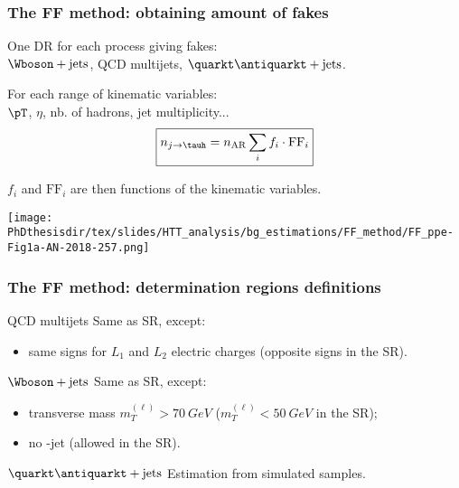\begin{frame}
\frametitle{The FF method: obtaining amount of fakes}

\begin{minipage}[c]{.45\textwidth}
\manip One DR for each process giving fakes:\\$\Wboson+\text{jets}$, QCD multijets, $\quarkt\antiquarkt+\text{jets}$.

\manip For each range of kinematic variables:\\
\qquad $\pT$, $\eta$, nb. of hadrons, jet multiplicity...
\begin{equation*}
\boxed{n_{j\to\tauh} = n_\text{AR}\sum_i f_i \cdot \mathrm{FF}_i}
\end{equation*}

\manip $f_i$ and $\mathrm{FF}_i$ are then functions of the kinematic variables.
\end{minipage}
\hfill
\begin{minipage}[c]{.45\textwidth}
\vspace{\graphh}
\end{minipage}
\begin{minipage}[c]{.45\textwidth}
\begin{center}
\texttt{[image: \\PhDthesisdir/tex/slides/HTT\_analysis/bg\_estimations/FF\_method/FF\_ppe-Fig1a-AN-2018-257.png]}
\end{center}
\end{minipage}
\end{frame}

\begin{frame}
\frametitle{The FF method: determination regions definitions}

\begin{block}{QCD multijets}
Same as SR, except:
\begin{itemize}
\item same signs for $L_1$ and $L_2$ electric charges (opposite signs in the SR).
\end{itemize}
\end{block}

\pause\vfill

\begin{block}{$\Wboson+\text{jets}$}
Same as SR, except:
\begin{itemize}
\item transverse mass $m_T^{(\ell)}>\SI{70}{GeV}$ ($m_T^{(\ell)}<\SI{50}{GeV}$ in the SR);
\item no \quarkb-jet (allowed in the SR).
\end{itemize}
\end{block}

\pause\vfill

\begin{block}{$\quarkt\antiquarkt+\text{jets}$}
Estimation from simulated samples.
\end{block}

\end{frame}

